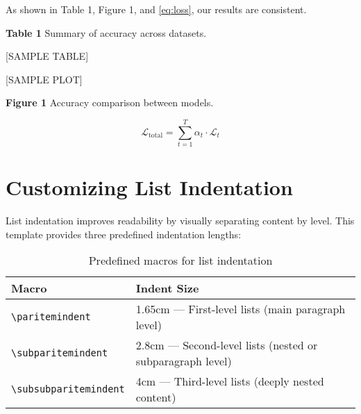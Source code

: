 \documentclass{VISTEC}
\begin{document}
\begin{tcolorbox}[colback=white, colframe=black, sharp corners, boxrule=0.4pt]
\hspace{1.25cm}As shown in Table 1, Figure 1, and \autoref{eq:loss}, our results are consistent.

\vspace{6pt}
\textbf{Table 1} Summary of accuracy across datasets.

\vspace{-6pt}
\begin{center}
[SAMPLE TABLE]
\end{center}

\begin{center}
[SAMPLE PLOT]
\end{center}
\vspace{-6pt}
\textbf{Figure 1} Accuracy comparison between models.

\begin{equation}
\mathcal{L}_{\text{total}} = \sum_{t=1}^{T} \alpha_t \cdot \mathcal{L}_t
\label{eq:loss}
\end{equation}

\end{tcolorbox}




\section{Customizing List Indentation}
\label{manual:indentation}

\begin{paragraph}
List indentation improves readability by visually separating content by level. This template provides three predefined indentation lengths:
\end{paragraph}

\begin{table}[ht]
\small\singlespacingplus
\centering
\caption{Predefined macros for list indentation}
\begin{tabular}{ll}
\toprule
\textbf{Macro} & \textbf{Indent Size} \\
\midrule
\verb|\paritemindent| & 1.65cm — First-level lists (main paragraph level) \\
\verb|\subparitemindent| & 2.8cm — Second-level lists (nested or subparagraph level) \\
\verb|\subsubparitemindent| & 4cm — Third-level lists (deeply nested content) \\
\bottomrule
\end{tabular}
\end{table}
\end{document}
